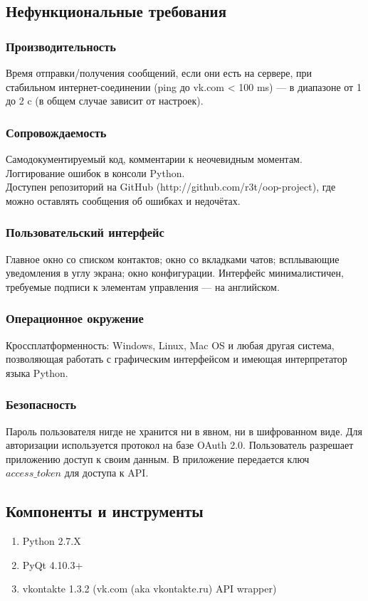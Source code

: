 \documentclass[12pt]{article}
\begin{document}
\subsection{Нефункциональные требования}

\subsubsection{Производительность}
Время отправки/получения сообщений, если они есть на сервере, при стабильном интернет-соединении (ping до vk.com < 100 ms) — в диапазоне от 1 до 2 c (в общем случае зависит от настроек).

\subsubsection{Сопровождаемость}
Самодокументируемый код, комментарии к неочевидным моментам. Логгирование ошибок в консоли Python. \\
Доступен репозиторий на GitHub (http://github.com/r3t/oop-project), где можно оставлять сообщения об ошибках и недочётах.

\subsubsection{Пользовательский интерфейс}
Главное окно со списком контактов; окно со вкладками чатов; всплывающие уведомления в углу экрана; окно конфигурации. Интерфейс минималистичен, требуемые подписи к элементам управления — на английском.

\subsubsection{Операционное окружение}
Кроссплатформенность: Windows, Linux, Mac OS и любая другая система, позволяющая работать с графическим интерфейсом и имеющая интерпретатор языка Python.

\subsubsection{Безопасность}
Пароль пользователя нигде не хранится ни в явном, ни в шифрованном виде. Для авторизации используется протокол на базе OAuth 2.0.
Пользователь разрешает приложению доступ к своим данным. В приложение передается ключ $access\_token$ для доступа к API.

\subsection{Компоненты и инструменты} 
\begin{enumerate}
\item Python 2.7.X
\item PyQt 4.10.3+
\item vkontakte 1.3.2 (vk.com (aka vkontakte.ru) API wrapper)
\end{enumerate}
\end{document}
